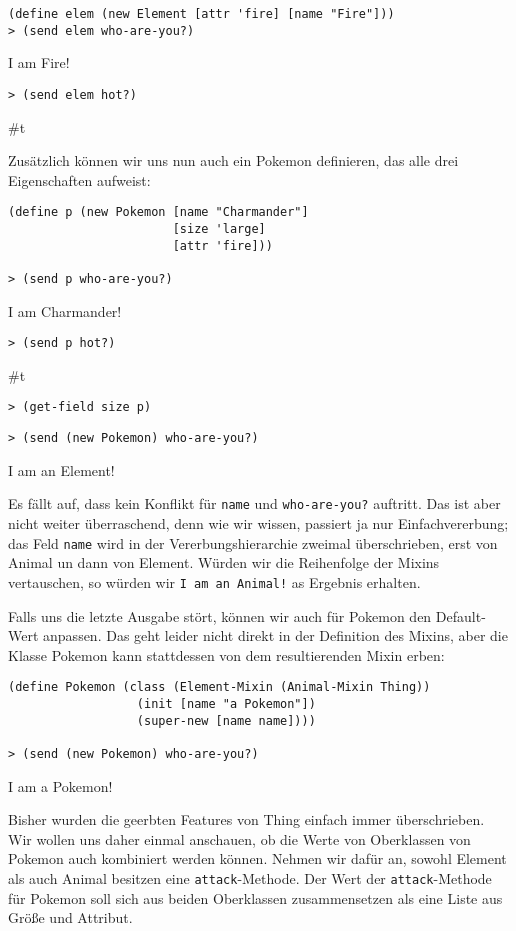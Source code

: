 \begin{lstlisting}
(define elem (new Element [attr 'fire] [name "Fire"]))
> (send elem who-are-you?)
\end{lstlisting} 
{\routput {\qq}I am Fire!\qq}

\begin{lstlisting}
> (send elem hot?)
\end{lstlisting} 
{\routput \#t}

Zusätzlich können wir uns nun auch ein Pokemon definieren, das alle drei Eigenschaften aufweist:
\begin{lstlisting}
(define p (new Pokemon [name "Charmander"]
                       [size 'large]
                       [attr 'fire]))
 
> (send p who-are-you?)
\end{lstlisting}
{\routput {\qq}I am Charmander!\qq}
\begin{lstlisting}
> (send p hot?)
\end{lstlisting}
{\routput \#t}
\begin{lstlisting}
> (get-field size p)
\end{lstlisting}
{}
\begin{lstlisting}
> (send (new Pokemon) who-are-you?)
\end{lstlisting}
{\routput {\qq}I am an Element!\qq}

Es fällt auf, dass kein Konflikt für \texttt{name} und \texttt{who-are-you?} auftritt. Das ist aber nicht weiter überraschend, denn wie wir wissen, passiert ja nur Einfachvererbung; das Feld \texttt{name} wird in der Vererbungshierarchie zweimal überschrieben, erst von Animal un dann von Element. Würden wir die Reihenfolge der Mixins vertauschen, so würden wir \texttt{{\qq}I am an Animal!\qq} as Ergebnis erhalten.

Falls uns die letzte Ausgabe stört, können wir auch für Pokemon den Default-Wert anpassen. Das geht leider nicht direkt in der Definition des Mixins, aber die Klasse Pokemon kann stattdessen von dem resultierenden Mixin erben:

\begin{lstlisting}
(define Pokemon (class (Element-Mixin (Animal-Mixin Thing))
                  (init [name "a Pokemon"])
                  (super-new [name name])))
     
> (send (new Pokemon) who-are-you?)
\end{lstlisting}
{\routput {\qq}I am a Pokemon!\qq}

Bisher wurden die geerbten Features von Thing einfach immer überschrieben. Wir wollen uns daher einmal anschauen, ob die Werte von Oberklassen von Pokemon auch kombiniert werden können. Nehmen wir dafür an, sowohl Element als auch Animal besitzen eine \texttt{attack}-Methode. Der Wert der \texttt{attack}-Methode für Pokemon soll sich aus beiden Oberklassen zusammensetzen als eine Liste aus Größe und Attribut.


